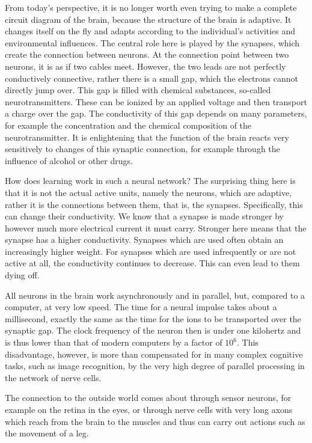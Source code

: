 \documentclass[10pt]{article}
\begin{document}
From today's perspective, it is no longer worth even trying to make a complete circuit diagram of the brain, because the structure of the brain is adaptive. It changes itself on the fly and adapts according to the individual's activities and environmental influences. The central role here is played by the synapses, which create the connection between neurons. At the connection point between two neurons, it is as if two cables meet. However, the two leads are not perfectly conductively connective, rather there is a small gap, which the electrons cannot directly jump over. This gap is filled with chemical substances, so-called neurotransmitters. These can be ionized by an applied voltage and then transport a charge over the gap. The conductivity of this gap depends on many parameters, for example the concentration and the chemical composition of the neurotransmitter. It is enlightening that the function of the brain reacts very sensitively to changes of this synaptic connection, for example through the influence of alcohol or other drugs.

How does learning work in such a neural network? The surprising thing here is that it is not the actual active units, namely the neurons, which are adaptive, rather it is the connections between them, that is, the synapses. Specifically, this can change their conductivity. We know that a synapse is made stronger by however much more electrical current it must carry. Stronger here means that the synapse has a higher conductivity. Synapses which are used often obtain an increasingly higher weight. For synapses which are used infrequently or are not active at all, the conductivity continues to decrease. This can even lead to them dying off.

All neurons in the brain work asynchronously and in parallel, but, compared to a computer, at very low speed. The time for a neural impulse takes about a millisecond, exactly the same as the time for the ions to be transported over the synaptic gap. The clock frequency of the neuron then is under one kilohertz and is thus lower than that of modern computers by a factor of $10^{6}$. This disadvantage, however, is more than compensated for in many complex cognitive tasks, such as image recognition, by the very high degree of parallel processing in the network of nerve cells.

The connection to the outside world comes about through sensor neurons, for example on the retina in the eyes, or through nerve cells with very long axons which reach from the brain to the muscles and thus can carry out actions such as the movement of a leg.
\end{document}
